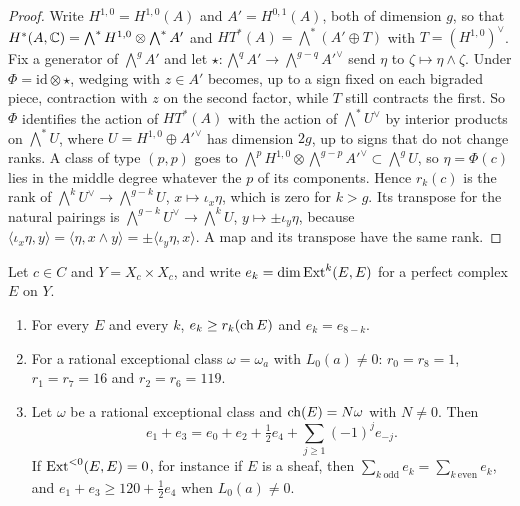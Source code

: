\begin{proof}
Write $H^{1,0}=H^{1,0}(A)$ and $A'=H^{0,1}(A)$, both of dimension $g$, so
that $H^{*}(A,\mathbb{C})=\bigwedge^{*}H^{1,0}\otimes\bigwedge^{*}A'$ and
$HT^{*}(A)=\bigwedge^{*}(A'\oplus T)$ with $T=(H^{1,0})^{\vee}$. Fix a
generator of $\bigwedge^{g}A'$ and let
$\star\colon\bigwedge^{q}A'\to\bigwedge^{g-q}A'^{\vee}$ send $\eta$ to
$\zeta\mapsto\eta\wedge\zeta$. Under $\Phi=\mathrm{id}\otimes\star$, wedging
with $z\in A'$ becomes, up to a sign fixed on each bigraded piece, contraction
with $z$ on the second factor, while $T$ still contracts the first. So $\Phi$
identifies the action of $HT^{*}(A)$ with the action of
$\bigwedge^{*}U^{\vee}$ by interior products on $\bigwedge^{*}U$, where
$U=H^{1,0}\oplus A'^{\vee}$ has dimension $2g$, up to signs that do not change
ranks. A class of type $(p,p)$ goes to
$\bigwedge^{p}H^{1,0}\otimes\bigwedge^{g-p}A'^{\vee}\subset\bigwedge^{g}U$,
so $\eta=\Phi(c)$ lies in the middle degree whatever the $p$ of its
components. Hence $r_{k}(c)$ is the rank of
$\bigwedge^{k}U^{\vee}\to\bigwedge^{g-k}U$, $x\mapsto\iota_{x}\eta$, which is
zero for $k>g$. Its transpose for the natural pairings is
$\bigwedge^{g-k}U^{\vee}\to\bigwedge^{k}U$, $y\mapsto\pm\iota_{y}\eta$,
because $\langle\iota_{x}\eta,y\rangle=\langle\eta,x\wedge y\rangle
=\pm\langle\iota_{y}\eta,x\rangle$. A map and its transpose have the same
rank.
\end{proof}

\begin{theorem}\label{thm:mumfordprofile}
Let $c\in C$ and $Y=X_{c}\times X_{c}$, and write
$e_{k}=\dim\operatorname{Ext}^{k}(E,E)$ for a perfect complex $E$ on $Y$.
\begin{enumerate}[label=\textup{(\roman*)},leftmargin=2.6em,itemsep=2pt]
\item For every $E$ and every $k$, $e_{k}\ge r_{k}(\operatorname{ch} E)$ and
  $e_{k}=e_{8-k}$.
\item For a rational exceptional class $\omega=\omega_{a}$ with
  $L_{0}(a)\ne0$: $r_{0}=r_{8}=1$, $r_{1}=r_{7}=16$ and $r_{2}=r_{6}=119$.
\item Let $\omega$ be a rational exceptional class and $\operatorname{ch}(E)=N\omega$
  with $N\ne0$. Then
  \[
    e_{1}+e_{3}=e_{0}+e_{2}+\tfrac12e_{4}
      +\sum_{j\ge1}(-1)^{j}e_{-j}.
  \]
  If $\operatorname{Ext}^{<0}(E,E)=0$, for instance if $E$ is a sheaf, then
  $\sum_{k\ \mathrm{odd}}e_{k}=\sum_{k\ \mathrm{even}}e_{k}$, and
  $e_{1}+e_{3}\ge120+\frac12e_{4}$ when $L_{0}(a)\ne0$.
\end{enumerate}
\end{theorem}

